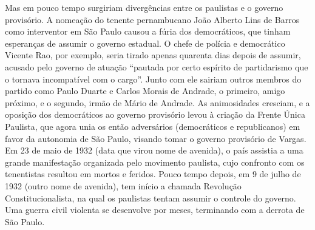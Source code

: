 Mas em pouco tempo surgiriam divergências entre os paulistas e o governo
provisório. A nomeação do tenente pernambucano João Alberto Lins de
Barros como interventor em São Paulo causou a fúria dos democráticos,
que tinham esperanças de assumir o governo estadual. O chefe de polícia
e democrático Vicente Rao, por exemplo, seria tirado apenas quarenta
dias depois de assumir, acusado pelo governo de atuação ``pautada por
certo espírito de partidarismo que o tornava incompatível com o cargo''.
Junto com ele sairiam outros membros do partido como Paulo Duarte e
Carlos Morais de Andrade, o primeiro, amigo próximo, e o segundo, irmão
de Mário de Andrade. As animosidades cresciam, e a oposição dos
democráticos ao governo provisório levou à criação da Frente Única
Paulista, que agora unia os então adversários (democráticos e
republicanos) em favor da autonomia de São Paulo, visando tomar o
governo provisório de Vargas. Em 23 de maio de 1932 (data que virou nome
de avenida), o país assistia a uma grande manifestação organizada pelo
movimento paulista, cujo confronto com os tenentistas resultou em mortos
e feridos. Pouco tempo depois, em 9 de julho de 1932 (outro nome de
avenida), tem início a chamada Revolução Constitucionalista, na qual os
paulistas tentam assumir o controle do governo. Uma guerra civil
violenta se desenvolve por meses, terminando com a derrota de São Paulo.



